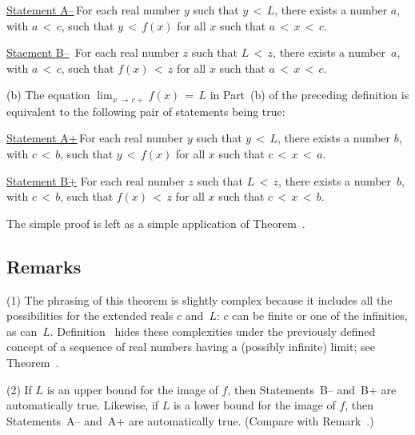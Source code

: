 \VA

        \h \underline{Statement A--}\,For each real number $y$ such that $y\,<\,L$, there exists a number $a$, with $a\,<\,c$,
    such that $y\,<\,f(x)$ for all $x$ such that $a\,<\,x\,<\,c$.

        \h \underline{Staement B--}\, For each real number $z$ such that $L\,<\,z$, there exists a number~$a$, with $a\,<\,c$,
    such that $f(x)\,<\,z$ for all $x$ such that $a\,<\,x\,<\,c$.

\V

        (b) The equation $\lim_{x \,{\rightarrow}\, c+} f(x) \,=\, L$ in Part~(b)
    of the preceding definition is equivalent to the following pair of statements being true:

\VA

        \h \underline{Statement A+}\,For each real number $y$ such that $y\,<\,L$, there exists a number $b$, with $c\,<\,b$,
    such that $y\,<\,f(x)$ for all $x$ such that $c\,<\,x\,<\,a$.

        \h \underline{Statement B+} For each real number $z$ such that $L\,<\,z$, there exists a number~$b$, with $c\,<\,b$,
    such that $f(x)\,<\,z$ for all $x$ such that $c\,<\,x\,<\,b$.

\V

        The simple proof is left as a simple application of Theorem~. %

\V


            \subsection{\small{\bf Remarks}}
            \label{RemrkD50.35}

\V

\hspace*{\parindent}(1) The phrasing of this theorem is slightly complex because it includes all the possibilities for the extended reals $c$ and~$L$:
    $c$ can be finite or one of the infinities, as can~$L$. Definition~
    hides these complexities under the previously defined concept of a sequence of real numbers having a (possibly infinite) limit; see Theorem~.

\V

        (2) If $L$ is an upper bound for the image of $f$, then Statements~B-- and~B+ are automatically true.
    Likewise, if $L$ is a lower bound for the image of $f$, then Statements~A-- and~A+ are automatically true.
    (Compare with Remark~.)

